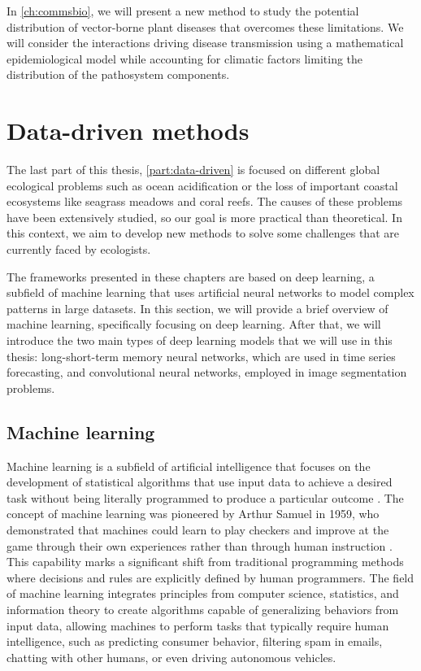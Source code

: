 In \cref{ch:commsbio}, we will present a new method to study the potential
distribution of vector-borne plant diseases that overcomes these limitations.
We will consider the interactions driving disease transmission using a
mathematical epidemiological model while accounting for climatic factors
limiting the distribution of the pathosystem components.

\section{\label{sec:Data-driven methods} Data-driven methods}

The last part of this thesis, \cref{part:data-driven} is focused on different
global ecological problems such as ocean acidification or the loss of
important
coastal ecosystems like seagrass meadows and coral reefs. The causes of
these problems have been extensively studied, so our goal is more
practical than theoretical. In this context, we aim to develop new methods to
solve some challenges that are currently faced by ecologists.

The frameworks presented in these chapters are based on deep learning, a
subfield of machine learning that uses artificial neural networks to model
complex patterns in large datasets. In this section, we will provide a brief
overview of machine learning, specifically focusing on deep learning. After
that, we will introduce the two main types of deep learning models that we
will
use in this thesis: long-short-term memory neural networks, which are used in
time series forecasting, and convolutional neural networks, employed in image
segmentation problems.

\subsection{\label{sec:Machine learning} Machine learning}

Machine learning is a subfield of artificial intelligence that focuses on the
development of statistical algorithms that use input data to achieve a
desired task without being literally programmed to produce a particular outcome
\cite{Michalski2013,ElNaqa2015}. The concept of machine learning was
pioneered by Arthur Samuel in 1959, who demonstrated that machines could learn
to play checkers and improve at the game through their own experiences rather
than through human instruction \cite{Samuel2000}. This capability marks a
significant shift from traditional programming methods where decisions and
rules are explicitly defined by human programmers. The field of machine
learning integrates principles from computer science, statistics, and
information theory to create algorithms capable of generalizing behaviors
from input data, allowing machines to perform tasks that typically require
human intelligence, such as predicting consumer behavior, filtering spam in
emails, chatting with other humans, or even driving autonomous vehicles.

